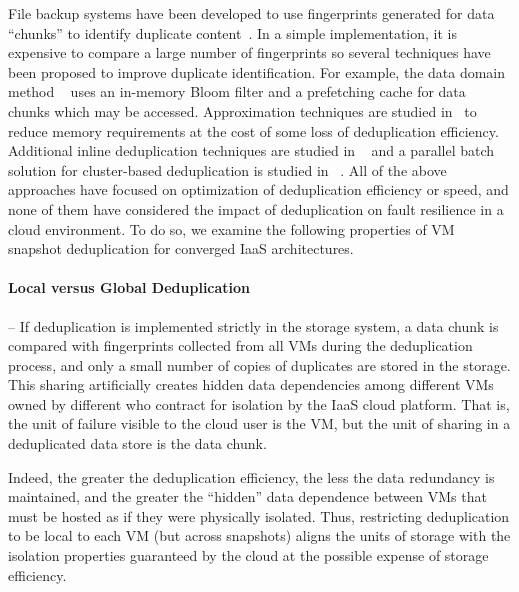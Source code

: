 File backup systems have been developed to use fingerprints generated for
data ``chunks''  to identify duplicate
content~\cite{venti02,Rhea2008}.  In a simple implementation,
it is expensive to compare a large number of 
fingerprints
so several techniques have been proposed to improve duplicate identification. 
For example, the data domain method ~\cite{bottleneck08} 
uses  an in-memory Bloom filter and a prefetching cache for data chunks 
which may be
accessed.  
Approximation techniques are studied in~\cite{extreme_binning09,Guo2011,WeiZhangIEEE}  
to reduce memory requirements at the cost of some loss of deduplication
efficiency.
Additional inline deduplication techniques are studied in ~\cite{sparseindex09,Guo2011,Srinivasan2012}
and a parallel batch solution for cluster-based deduplication is 
studied in ~\cite{wei2013}. 
All of the above approaches have focused on optimization of deduplication
efficiency or speed, and none of them have considered the impact
of deduplication on fault resilience in a cloud environment.  To do so, we
examine the following properties of VM snapshot deduplication for converged
IaaS architectures.
\paragraph*{Local versus Global Deduplication} --
If deduplication is implemented strictly in the storage system,
a data chunk is compared with fingerprints collected from all VMs during
the deduplication process, and only a small number of
copies of duplicates are stored in the storage.  This sharing
artificially creates hidden data dependencies among different VMs owned by
different 
who
contract for isolation 
by the IaaS cloud platform.  That is, the unit of failure visible to the cloud
user is the VM, but the unit of sharing in a deduplicated data store is the
data chunk. 


Indeed, the greater the deduplication efficiency, the less
the data redundancy is maintained, and the greater the ``hidden'' data
dependence between VMs that must be hosted as if they were physically isolated.
Thus,
restricting deduplication to be local to each VM (but across snapshots) 
aligns the units of storage with the isolation properties guaranteed by the
cloud at the possible expense of storage efficiency.

